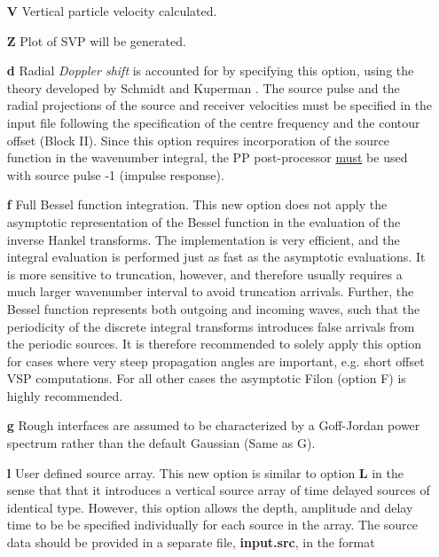 \begin{itemize}
	     \item[{\bf V}] Vertical particle velocity calculated.
	     \item[{\bf Z}] Plot of SVP will be generated.

    \item[{\bf d}] Radial {\em Doppler shift} is accounted for by
specifying  this option, using the theory developed by Schmidt and Kuperman
\cite{sk:jasa94}.  The source pulse and the radial projections of the
source and  receiver velocities must be specified in the input file
following the specification of the centre frequency and the contour
offset (Block II). Since this option requires incorporation of the
source function in the wavenumber integral, the PP post-processor
\underline{must} be used with source pulse -1 (impulse response).

    \item[{\bf f}]     Full Bessel function integration. This new option  does 
          not  apply the asymptotic representation of the  Bessel 
          function  in  the  evaluation  of  the  inverse  Hankel 
          transforms.  The implementation is very efficient,  and 
          the  integral evaluation is performed just as  fast  as 
          the  asymptotic  evaluations. It is more  sensitive  to 
          truncation,  however, and therefore usually requires  a 
          much  larger  wavenumber interval to  avoid  truncation 
          arrivals. Further, the Bessel function represents  both 
          outgoing and incoming waves, such that the  periodicity 
          of  the discrete integral transforms  introduces  false 
          arrivals  from  the periodic sources. It  is  therefore 
          recommended to solely apply this option for cases where 
          very steep propagation angles are important, e.g. short 
          offset  VSP  computations.  For  all  other  cases  the 
          asymptotic Filon (option F) is highly recommended. 
    \item[{\bf g}] Rough interfaces are assumed to be characterized by
a Goff-Jordan power spectrum rather than the default Gaussian (Same as G). 
    \item[{\bf l}] User defined source array. This new option is
similar to option {\bf L} in the sense that that it introduces a
vertical source array of time delayed sources of identical type. However,
this option allows the depth, amplitude and  delay time to be be
specified individually for each source in the array. The source data
should be provided in a separate file, {\bf input.src}, in the format

\end{itemize}
